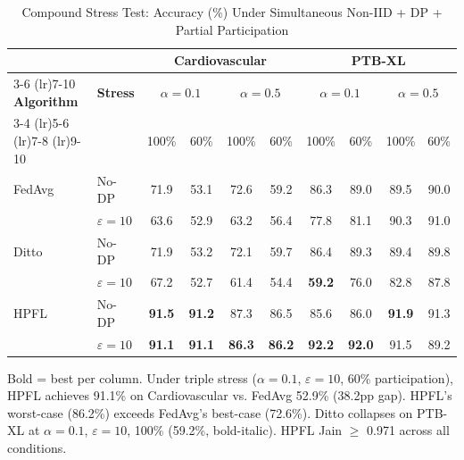 \documentclass[conference]{IEEEtran}
\begin{document}
\begin{table}[htbp]
\centering
\caption{Compound Stress Test: Accuracy (\%) Under Simultaneous Non-IID + DP + Partial Participation}
\label{tab:compound_stress}
\small
\begin{tabular}{llcccccccc}
\toprule
 & & \multicolumn{4}{c}{\textbf{Cardiovascular}} & \multicolumn{4}{c}{\textbf{PTB-XL}} \\
\cmidrule(lr){3-6} \cmidrule(lr){7-10}
\textbf{Algorithm} & \textbf{Stress} & \multicolumn{2}{c}{$\alpha{=}0.1$} & \multicolumn{2}{c}{$\alpha{=}0.5$} & \multicolumn{2}{c}{$\alpha{=}0.1$} & \multicolumn{2}{c}{$\alpha{=}0.5$} \\
\cmidrule(lr){3-4} \cmidrule(lr){5-6} \cmidrule(lr){7-8} \cmidrule(lr){9-10}
 & & 100\% & 60\% & 100\% & 60\% & 100\% & 60\% & 100\% & 60\% \\
\midrule
FedAvg & No-DP & 71.9 & 53.1 & 72.6 & 59.2 & 86.3 & 89.0 & 89.5 & 90.0 \\
 & $\varepsilon{=}10$ & 63.6 & 52.9 & 63.2 & 56.4 & 77.8 & 81.1 & 90.3 & 91.0 \\
\midrule
Ditto & No-DP & 71.9 & 53.2 & 72.1 & 59.7 & 86.4 & 89.3 & 89.4 & 89.8 \\
 & $\varepsilon{=}10$ & 67.2 & 52.7 & 61.4 & 54.4 & \textbf{59.2} & 76.0 & 82.8 & 87.8 \\
\midrule
HPFL & No-DP & \textbf{91.5} & \textbf{91.2} & 87.3 & 86.5 & 85.6 & 86.0 & \textbf{91.9} & 91.3 \\
 & $\varepsilon{=}10$ & \textbf{91.1} & \textbf{91.1} & \textbf{86.3} & \textbf{86.2} & \textbf{92.2} & \textbf{92.0} & 91.5 & 89.2 \\
\bottomrule
\end{tabular}

\vspace{1mm}
\footnotesize{Bold = best per column. Under triple stress ($\alpha{=}0.1$, $\varepsilon{=}10$, 60\% participation), HPFL achieves 91.1\% on Cardiovascular vs. FedAvg 52.9\% (38.2pp gap). HPFL's worst-case (86.2\%) exceeds FedAvg's best-case (72.6\%). Ditto collapses on PTB-XL at $\alpha{=}0.1$, $\varepsilon{=}10$, 100\% (59.2\%, bold-italic). HPFL Jain $\geq$ 0.971 across all conditions.}
\end{table}
\end{document}
